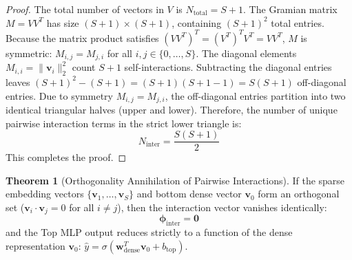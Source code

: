 \documentclass[11pt,a4paper]{article}
\theoremstyle{definition}
\newtheorem{theorem}{\textbf{Theorem}}[section]
\begin{document}
\begin{proof}
The total number of vectors in $V$ is $N_{\text{total}} = S + 1$.
The Gramian matrix $M = V V^T$ has size $(S + 1) \times (S + 1)$, containing $(S + 1)^2$ total entries.
Because the matrix product satisfies $(V V^T)^T = (V^T)^T V^T = V V^T$, $M$ is symmetric: $M_{i, j} = M_{j, i}$ for all $i, j \in \{0, \dots, S\}$.
The diagonal elements $M_{i, i} = \|\mathbf{v}_i\|_2^2$ count $S + 1$ self-interactions.
Subtracting the diagonal entries leaves $(S + 1)^2 - (S + 1) = (S + 1)(S + 1 - 1) = S(S + 1)$ off-diagonal entries.
Due to symmetry $M_{i, j} = M_{j, i}$, the off-diagonal entries partition into two identical triangular halves (upper and lower).
Therefore, the number of unique pairwise interaction terms in the strict lower triangle is:
{\boldmath
\begin{equation}
N_{\text{inter}} = \frac{S(S + 1)}{2}
\end{equation}
}
This completes the proof.
\end{proof}

\begin{theorem}[Orthogonality Annihilation of Pairwise Interactions]
If the sparse embedding vectors $\{\mathbf{v}_1, \dots, \mathbf{v}_S\}$ and bottom dense vector $\mathbf{v}_0$ form an orthogonal set ($\mathbf{v}_i \cdot \mathbf{v}_j = 0$ for all $i \neq j$), then the interaction vector vanishes identically:
{\boldmath
\begin{equation}
\boldsymbol{\phi}_{\text{inter}} = \mathbf{0}
\end{equation}
}
and the Top MLP output reduces strictly to a function of the dense representation $\mathbf{v}_0$: $\widehat{y} = \sigma(\mathbf{w}_{\text{dense}}^T \mathbf{v}_0 + b_{\text{top}})$.
\end{theorem}
\end{document}
